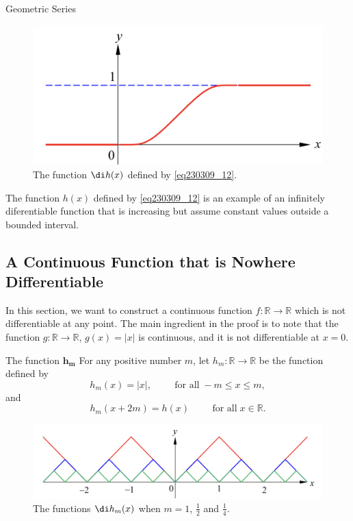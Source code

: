\begin{example}[label=230305_16]{Geometric Series}
\begin{example}[label=230304_9]{}
\begin{example}{}
\begin{example}{}
\begin{figure}[ht]
\centering
\includegraphics[scale=0.2]{Picture62.png}
\caption{The function $\di h(x)$ defined by \eqref{eq230309_12}.\fa}\label{figure62}
\end{figure}

\begin{remark}{}
The function $h(x)$ defined  by \eqref{eq230309_12}  is an example of an infinitely diferentiable function that is increasing but assume constant values outside a bounded interval.
\end{remark}



\bigskip
\subsection{A Continuous Function that is Nowhere Differentiable}\label{sec6.6.4}
In this section, we want to construct a continuous function $f:\mathbb{R}\to\mathbb{R}$ which is not differentiable at any point. The main ingredient in the proof is to note that the function $g:\mathbb{R}\to\mathbb{R}$, $g(x)=|x|$ is continuous, and it is not differentiable at $x=0$. 

\begin{definition}[label=230309_10]{The function $\pmb{h_m}$}
For any positive number $m$, let $h_m:\mathbb{R}\to\mathbb{R}$ be the function defined by
\[h_m(x)=|x|,\hspace{1cm}\text{for all}\;-m\leq x\leq m,\]
and
\[h_m(x+2m)=h(x)\hspace{1cm}\text{for all}\;x\in\mathbb{R}.\]

\end{definition}

\begin{figure}[ht]
\centering
\includegraphics[scale=0.2]{Picture63.png}
\caption{The functions $\di h_m(x)$ when $m=1$, $\frac{1}{2}$ and $\frac{1}{4}$.\fa}\label{figure63}
\end{figure}


\end{example}
\end{example}
\end{example}
\end{example}
